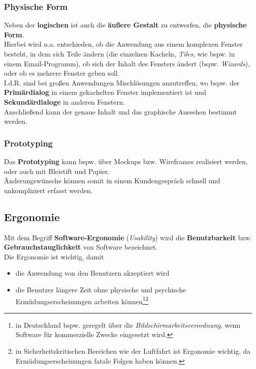 \subsubsection*{Physische Form}
Neben der \textbf{logischen} ist auch die \textbf{äußere Gestalt} zu entwerfen, die \textbf{physische Form}.\\
Hierbei wird u.a. entschieden, ob die Anwendung aus einem komplexen Fenster besteht, in dem sich Teile ändern (die einzelnen Kacheln, \textit{Tiles}, wie bspw. in einem Email-Programm), ob sich der Inhalt des Fensters ändert (bspw. \textit{Wizards}), oder ob es mehrere Fenster geben soll.\\
I.d.R. sind bei großen Anwendungen Mischlösungen anzutreffen, wo bspw. der \textbf{Primärdialog} in einem gekachelten Fenster implementiert ist und \textbf{Sekundärdialoge} in anderen Fenstern.\\

\noindent
Anschließend kann der genaue Inhalt und das graphische Aussehen bestimmt werden.

\subsubsection*{Prototyping}
Das \textbf{Prototyping} kann bspw. über Mockups bzw. Wireframes realisiert werden, oder auch mit Bleistift und Papier.\\
Änderungswünsche können somit in einem Kundengespräch schnell und unkompliziert erfasst werden.

\subsection{Ergonomie}
Mit dem Begriff \textbf{Software-Ergonomie} (\textit{Usability}) wird die \textbf{Benutzbarkeit} bzw. \textbf{Gebrauchstauglichkeit} von Software bezeichnet.\\

\noindent
Die Ergonomie ist wichtig, damit

\begin{itemize}
    \item die Anwendung von den Benutzern akzeptiert wird
    \item die Benutzer längere Zeit ohne physische und psychische Ermüdungserscheinungen arbeiten können\footnote{
    in Deutschland bspw. geregelt über die \textit{Bildschirmarbeitsverordnung}, wenn Software für kommerzielle Zwecke eingesetzt wird.
    }\footnote{
        in Sicherheitskritischen Bereichen wie der Luftfahrt ist Ergonomie wichtig, da Ermüdungserscheinungen fatale Folgen haben können.
    }
\end{itemize}

